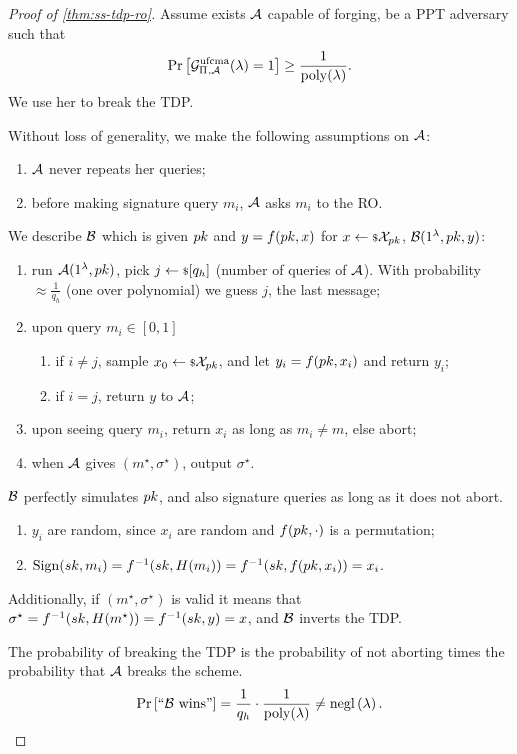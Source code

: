 \begin{proof}[Proof of \cref{thm:ss-tdp-ro}]
	Assume exists $\mathcal{A}$ capable of forging, \ie be a \ac{PPT} adversary such that
	\begin{equation*}
		\mathop{\mathrm{Pr}}\limits_{} \left[ {
			\mathcal{G}^{\scriptstyle \text{ufcma}}_{\Pi_{},\mathcal{A}}(\lambda) = 1
		} \right] \ge \frac{1}{\mathrm{poly}(\lambda)}.
	\end{equation*}
	We use her to break the \ac{TDP}.

	Without loss of generality, we make the following assumptions on $\mathcal{A}$:
	\begin{enumerate}
		\item $\mathcal{A}$ never repeats her queries;
		\item before making signature query $m_i$, $\mathcal{A}$ asks $m_i$ to the \ac{RO}.
	\end{enumerate}
	We describe $\mathcal{B}$ which is given $pk$ and $y = f(pk, x)$ for $x \leftarrow {\scriptstyle \$} {\mathcal{X}_{pk}}$, \ie $\mathcal{B}(1^{\lambda}, pk, y)$:
	\begin{enumerate}
		\item run $\mathcal{A}(1^{\lambda}, pk)$, pick $j \leftarrow {\scriptstyle \$} {[q_h]}$ (number of queries of $\mathcal{A}$).
			With probability $\approx \frac{1}{q_h}$ (one over polynomial) we guess $j$, the last message;
		\item upon query $m_i \in [0,1]$
			\begin{enumerate}
				\item if $i \neq j$, sample $x_0 \leftarrow {\scriptstyle \$} {\mathcal{X}_{pk}}$, and let $y_i = f(pk, x_i)$ and return $y_i$;
				\item if $i = j$, return $y$ to $\mathcal{A}$;
			\end{enumerate}
		\item upon seeing query $m_i$, return $x_i$ as long as $m_i \neq m$, else abort;
		\item when $\mathcal{A}$ gives $(m^{\star}, \sigma^{\star})$, output $\sigma^{\star}$.
	\end{enumerate}

	$\mathcal{B}$ perfectly simulates $pk$, and also signature queries as long as it does not abort.
	\begin{enumerate}
		\item $y_i$ are random, since $x_i$ are random and $f(pk, \cdot)$ is a permutation;
		\item $\mathrm{Sign}(sk, m_i) = f^{-1}(sk, H(m_i)) = f^{-1}(sk, f(pk, x_i)) = x_i$.
	\end{enumerate}
	Additionally, if $(m^{\star}, \sigma^{\star})$ is valid it means that $\sigma^{\star} = f^{-1}(sk, H(m^{\star})) = f^{-1}(sk, y) = x$, and $\mathcal{B}$ inverts the \ac{TDP}.

	The probability of breaking the \ac{TDP} is the probability of not aborting times the probability that $\mathcal{A}$ breaks the scheme.
	\begin{equation*}
		\mathop{\mathrm{Pr}}\limits_{} \left[ {
			\text{``$\mathcal{B}$ wins''}
		} \right] = \frac{1}{q_h} \cdot \frac{1}{\mathrm{poly}(\lambda)} \neq \mathrm{negl}\left({\lambda}\right). \qedhere
	\end{equation*}
\end{proof}

